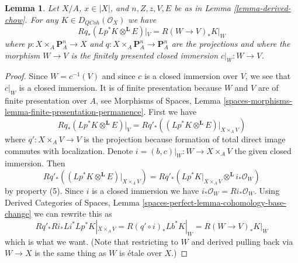 \documentclass[10pt,a4paper]{amsart}
\theoremstyle{plain}
\newtheorem{lemma}[subsection]{Lemma}
\theoremstyle{definition}
\theoremstyle{remark}
\numberwithin{equation}{subsection}
\def\QCoh{\mathit{QCoh}}
\begin{document}
\begin{lemma}
\label{lemma-compute-Fourier-Mukai-for-derived-chow}
Let $X/A$, $x \in |X|$, and
$n, Z, z, V, E$ be as in Lemma \ref{lemma-derived-chow}.
For any $K \in D_\QCoh(\mathcal{O}_X)$ we have
$$
Rq_*(Lp^*K \otimes^\mathbf{L} E)|_V = R(W \to V)_*K|_W
$$
where $p : X \times_A \mathbf{P}^n_A \to X$ and
$q : X \times_A \mathbf{P}^n_A \to \mathbf{P}^n_A$ are
the projections and where the morphism $W \to V$ is
the finitely presented closed immersion $c|_W : W \to V$.
\end{lemma}

\begin{proof}
Since $W = c^{-1}(V)$ and since $c$ is a closed immersion
over $V$, we see that $c|_W$ is a closed immersion.
It is of finite presentation because $W$ and $V$ are of finite
presentation over $A$, see
Morphisms of Spaces, Lemma
\ref{spaces-morphisms-lemma-finite-presentation-permanence}.
First we have
$$
Rq_*(Lp^*K \otimes^\mathbf{L} E)|_V =
Rq'_*\left((Lp^*K \otimes^\mathbf{L} E)|_{X \times_A V}\right)
$$
where $q' : X \times_A V \to V$ is the projection because
formation of total direct image commutes with localization.
Denote $i = (b, c)|_W : W \to X \times_A V$ the given closed immersion.
Then
$$
Rq'_*\left((Lp^*K \otimes^\mathbf{L} E)|_{X \times_A V}\right) =
Rq'_*(Lp^*K|_{X \times_A V} \otimes^\mathbf{L} i_*\mathcal{O}_W)
$$
by property (5). Since $i$ is a closed immersion we have
$i_*\mathcal{O}_W = Ri_*\mathcal{O}_W$.
Using
Derived Categories of Spaces,
Lemma \ref{spaces-perfect-lemma-cohomology-base-change}
we can rewrite this as
$$
Rq'_* Ri_* Li^* Lp^*K|_{X \times_A V} =
R(q' \circ i)_* Lb^*K|_W =
R(W \to V)_* K|_W
$$
which is what we want. (Note that restricting to $W$
and derived pulling back via $W \to X$ is the same thing
as $W$ is \'etale over $X$.)
\end{proof}
\end{document}
